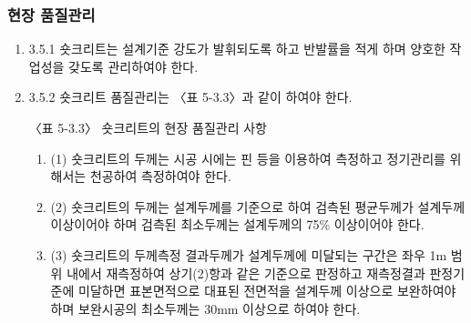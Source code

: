 \subsubsection{현장 품질관리}
\begin{enumerate}
\item  3.5.1 숏크리트는 설계기준 강도가 발휘되도록 하고 반발률을 적게 하며 양호한 작업성을 갖도록 관리하여야 한다.  
\item  3.5.2 숏크리트 품질관리는 〈표 5-3.3〉과 같이 하여야 한다.  
 
   
〈표 5-3.3〉 숏크리트의 현장 품질관리 사항
 
\begin{enumerate}
\item  (1) 숏크리트의 두께는 시공 시에는 핀 등을 이용하여 측정하고 정기관리를 위해서는 천공하여 측정하여야 한다. 
\item  (2) 숏크리트의 두께는 설계두께를 기준으로 하여 검측된 평균두께가 설계두께 이상이어야 하며 검측된 최소두께는 설계두께의 75\% 이상이어야 한다. 
\item  (3) 숏크리트의 두께측정 결과두께가 설계두께에 미달되는 구간은 좌우 1m 범위 내에서 재측정하여 상기(2)항과 같은 기준으로 판정하고 재측정결과 판정기준에 미달하면 표본면적으로 대표된 전면적을 설계두께 이상으로 보완하여야 하며 보완시공의 최소두께는 30mm 이상으로 하여야 한다. 
\end{enumerate}
 

\end{enumerate}
